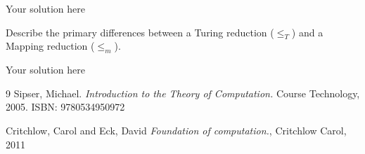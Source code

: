 \documentclass[12pt]{article}
\newenvironment{exercise}[2][Exercise]{\begin{trivlist}
\item[\hskip \labelsep {\bfseries #1}\hskip \labelsep {\bfseries #2.}]}{\end{trivlist}}
\newenvironment{solution}[1][{\color{red} Solution:}]{\begin{trivlist}
\item[\hskip \labelsep {\bfseries #1}\hskip \labelsep {\bfseries}]}{\end{trivlist}}
\begin{document}
\begin{solution}
Your solution here
\end{solution}

\clearpage

\begin{exercise}{4}

Describe the primary differences between a Turing reduction ($\le_T$) and a Mapping reduction ($\le_m$).

\end{exercise}

\begin{solution}
Your solution here
\end{solution}


\vfill
\begin{thebibliography}{9}
Sipser, Michael. 
\textit{Introduction to the Theory of Computation.}
Course Technology, 2005. ISBN: 9780534950972

Critchlow, Carol and Eck, David
\textit{Foundation of computation.},
Critchlow Carol, 2011

\end{thebibliography}

 
\end{document}
